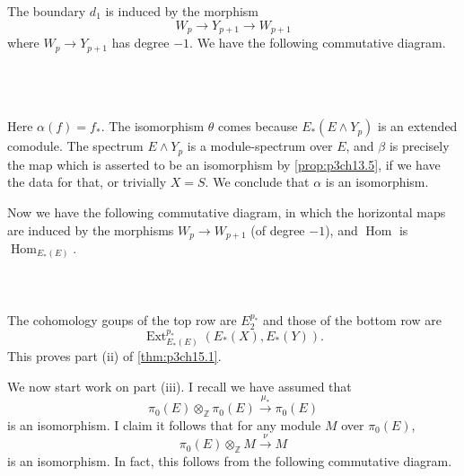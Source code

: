 \documentclass[../main]{subfiles}
\begin{document}
The boundary $d_1$ is induced by the morphism
$$W_p\longrightarrow Y_{p+1}\longrightarrow W_{p+1}$$
where $W_p\longrightarrow Y_{p+1}$ has degree $-1$. We have the following commutative diagram.
~\\~\\
~\\~\\
Here $\alpha(f)=f_\ast$. The isomorphism $\theta$ comes because $E_\ast(E\wedge Y_p)$ is an extended comodule. The spectrum $E\wedge Y_p$ is a module-spectrum over $E$, and $\beta$ is precisely the map which is asserted to be an isomorphism by \ref{prop:p3ch13.5}, if we have the data for that, or trivially $X=S$. We conclude that $\alpha$ is an isomorphism.

Now we have the following commutative diagram, in which the horizontal maps are induced by the morphisms $W_p\longrightarrow W_{p+1}$ (of degree $-1$), and $\operatorname{Hom}$ is $\operatorname{Hom}_{E_\ast(E)}$.
~\\~\\

~\\~\\
The cohomology goups of the top row are $E_2^{p_\ast}$ and those of the bottom row are
$$\operatorname{Ext}_{E_\ast(E)}^{p_\ast}(E_\ast(X), E_\ast(Y)).$$
This proves part (ii) of \ref{thm:p3ch15.1}.

\par We now start work on part (iii). I recall we have assumed that 
$$\pi_0(E)\otimes_\mathbb{Z} \pi_0(E)\overset{\mu_\ast}{\longrightarrow}\pi_0(E)$$ is an isomorphism. I claim it follows that for any module $M$ over $\pi_0(E)$,
$$\pi_0(E)\otimes_\mathbb{Z} M \overset{\nu}{\longrightarrow} M$$
is an isomorphism. In fact, this follows from the following commutative diagram.
\end{document}
